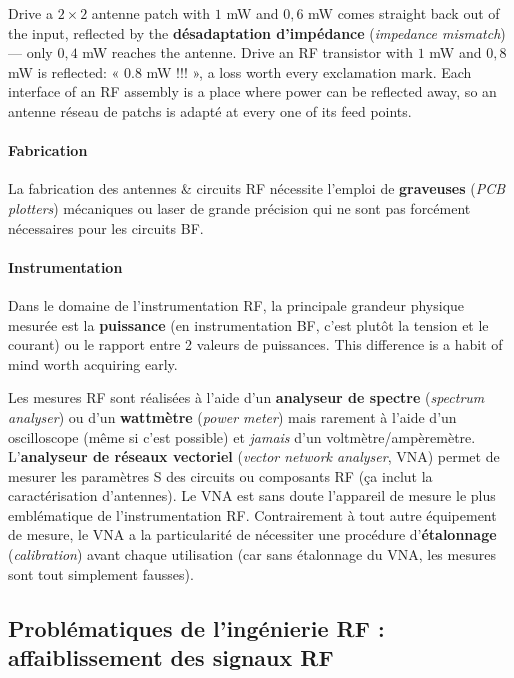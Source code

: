 \begin{example}
  Drive a $2\times 2$ antenne patch with $1$ mW and $0{,}6$ mW comes straight
  back out of the input, reflected by the \textbf{désadaptation d'impédance}
  (\textit{impedance mismatch}) --- only $0{,}4$ mW reaches the antenne. Drive
  an RF transistor with $1$ mW and $0{,}8$ mW is reflected: « $0.8$ mW !!! », a
  loss worth every exclamation mark. Each interface of an RF assembly is a place
  where power can be reflected away, so an antenne réseau de patchs is adapté
  at every one of its feed points.
\end{example}

\paragraph{Fabrication} La fabrication des antennes \& circuits RF nécessite
l'emploi de \textbf{graveuses} (\textit{PCB plotters}) mécaniques ou laser de
grande précision qui ne sont pas forcément nécessaires pour les circuits BF.

\paragraph{Instrumentation} Dans le domaine de l'instrumentation RF, la
principale grandeur physique mesurée est la \textbf{puissance} (en
instrumentation BF, c'est plutôt la tension et le courant) ou le rapport entre
2 valeurs de puissances. This difference is a habit of mind worth acquiring
early.

\begin{notation}
  Les mesures RF sont réalisées à l'aide d'un \textbf{analyseur de spectre}
  (\textit{spectrum analyser}) ou d'un \textbf{wattmètre} (\textit{power
  meter}) mais rarement à l'aide d'un oscilloscope (même si c'est possible) et
  \textit{jamais} d'un voltmètre/ampèremètre.
  L'\textbf{analyseur de réseaux vectoriel} (\textit{vector network analyser},
  VNA) permet de mesurer les paramètres S des circuits ou composants RF (ça
  inclut la caractérisation d'antennes). Le VNA est sans doute l'appareil de
  mesure le plus emblématique de l'instrumentation RF. Contrairement à tout
  autre équipement de mesure, le VNA a la particularité de nécessiter une
  procédure d'\textbf{étalonnage} (\textit{calibration}) avant chaque
  utilisation (car sans étalonnage du VNA, les mesures sont tout simplement
  fausses).
\end{notation}

\subsection{Problématiques de l'ingénierie RF : affaiblissement des signaux RF}

